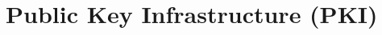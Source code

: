 \documentclass[../main.tex]{subfiles}
\begin{document}
\chapter{Public Key Infrastructure (PKI)}
\end{document}
